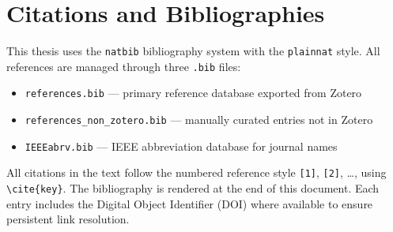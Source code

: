 \section{Citations and Bibliographies}

This thesis uses the \texttt{natbib} bibliography system with the \texttt{plainnat} style.
All references are managed through three \texttt{.bib} files:
\begin{itemize}
    \item \texttt{references.bib} --- primary reference database exported from Zotero
    \item \texttt{references\_non\_zotero.bib} --- manually curated entries not in Zotero
    \item \texttt{IEEEabrv.bib} --- IEEE abbreviation database for journal names
\end{itemize}

All citations in the text follow the numbered reference style \texttt{[1]}, \texttt{[2]}, \ldots,
using \verb|\cite{key}|. The bibliography is rendered at the end of this document.
Each entry includes the Digital Object Identifier (DOI) where available to ensure
persistent link resolution.
